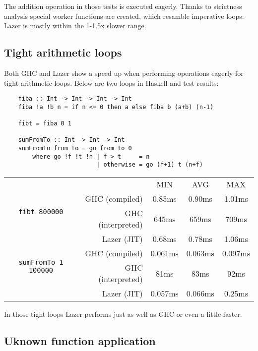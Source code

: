 \documentclass[en]{pracamgr}
\begin{document}
The addition operation in those tests is executed
eagerly. Thanks to strictness analysis special worker
functions are created, which resamble imperative loops.
Lazer is mostly within the 1-1.5x slower range.

\subsection{Tight arithmetic loops}

Both GHC and Lazer show a speed up when performing
operations eagerly for tight arithmetic loops.
Below are two loops in Haskell and test results:

\begin{verbatim}
    fiba :: Int -> Int -> Int -> Int
    fiba !a !b n = if n <= 0 then a else fiba b (a+b) (n-1)
    
    fibt = fiba 0 1

    sumFromTo :: Int -> Int -> Int
    sumFromTo from to = go from to 0
        where go !f !t !n | f > t     = n
                          | otherwise = go (f+1) t (n+f)
\end{verbatim}

\begin{center}
\begin{tabular}{c r c c c}
    & & MIN & AVG & MAX \\
    \cline{3-5}

    \multirow{2}{*}{\texttt{fibt 800000}}
    & GHC (compiled)& 0.85ms & 0.90ms & 1.01ms \\
    & GHC (interpreted)& 645ms & 659ms & 709ms \\
    & Lazer (JIT)& 0.68ms & 0.78ms & 1.06ms \\
    \cline{2-5}

    \multirow{2}{*}{\texttt{sumFromTo 1 100000}}
    & GHC (compiled)& 0.061ms & 0.063ms & 0.097ms \\
    & GHC (interpreted)& 81ms & 83ms & 92ms \\
    & Lazer (JIT)& 0.057ms & 0.066ms & 0.25ms \\
\end{tabular}
\end{center}

In those tight loops Lazer performs just as well as GHC
or even a little faster.

\subsection{Uknown function application}\label{bench:app}
\end{document}
